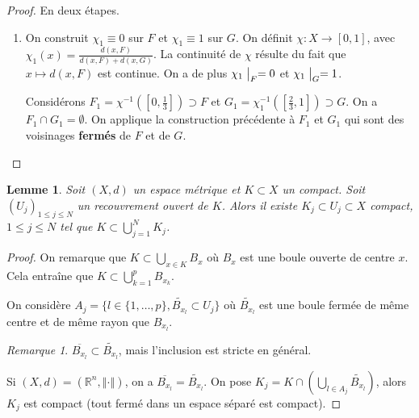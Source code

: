 \documentclass[french]{book}
\newtheorem*{protolemma}{Lemme}
\newenvironment{lemma}
    {\colorlet{shadecolor}{pink!15}\begin{shaded}\begin{protolemma}}
    {\end{protolemma}\end{shaded}}
\theoremstyle{definition}
\theoremstyle{remark}
\newtheorem*{remark}{Remarque}
\begin{document}
\begin{proof}
  En deux étapes.

  \begin{enumerate}
    \item On construit \(\chi_1 \equiv 0\) sur \(F\) et \(\chi_1 \equiv 1\) sur \(G\). On définit \(\chi : X \longrightarrow [0,1]\), avec \(\chi_1(x) = \displaystyle \frac{d(x,F)}{d(x,F)+ d(x,G)}\). La continuité de \(\chi\) résulte du fait que \(x \longmapsto d(x,F)\) est continue. On a de plus \(\chi_1 \bigm|_F = 0\) et \(\chi_1 \bigm|_G = 1\).

    Considérons \(F_1 = \chi ^{-1}\left(\left[0,\frac{1}{3}\right]\right) \supset F\) et \(G_1 = \chi_1 ^{-1}\left(\left[\frac{2}{3}, 1\right]\right) \supset G\). On a \(F_1 \cap G_1 = \emptyset\). On applique la construction précédente à \(F_1\) et \(G_1\) qui sont des voisinages \textbf{fermés} de \(F\) et de \(G\).
  \end{enumerate}
\end{proof}

\begin{lemma}\label{12}
  Soit \((X,d)\) un espace métrique et \(K \subset X\) un compact. Soit \((U_j)_{1 \leq j \leq N}\) un recouvrement ouvert de \(K\). Alors il existe \(K_j \subset U_j \subset X\) compact, \(1 \leq j \leq N\) tel que \(K \subset \displaystyle \bigcup _{j=1}^{N} K_j\).
\end{lemma}

\begin{proof}
  On remarque que \(K \subset \displaystyle\bigcup _{x \in K} B_x\) où \(B_x\) est une boule ouverte de centre \(x\). Cela entraîne que \(K \subset \displaystyle \bigcup _{k=1}^{p} B _{x_k}\).

  On considère \(A_j = \{ l \in \{ 1, \dots, p \}, \widetilde{B _{x_l}} \subset U_j\}\) où \(\widetilde{B _{x_l}}\) est une boule fermée de même centre et de même rayon que \(B _{x_l}\).

  \begin{remark}
    \(\overline{B_{x_l}} \subset \widetilde{B_{x_l}}\), mais l'inclusion est stricte en général.
  \end{remark}

  Si \((X,d) = (\mathbb{R}^n, \left\Vert \cdot \right\Vert )\), on a \(\overline{B _{x_l}} = \widetilde{B _{x_l}}\). On pose \(K_j = K \cap \left(\displaystyle\bigcup_{l \in A_j}\widetilde{B _{x_l}}\right)\), alors \(K_j\) est compact (tout fermé dans un espace séparé est compact).
\end{proof}
\end{document}
